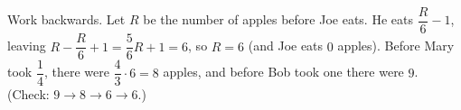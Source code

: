 Work backwards. Let $R$ be the number of apples before Joe eats. He eats $\dfrac R6-1$, leaving $R-\dfrac R6+1=\dfrac56R+1=6$, so $R=6$ (and Joe eats $0$ apples). Before Mary took $\dfrac14$, there were $\dfrac43\cdot6=8$ apples, and before Bob took one there were $\boxed{9}$. (Check: $9\to8\to6\to6$.)

